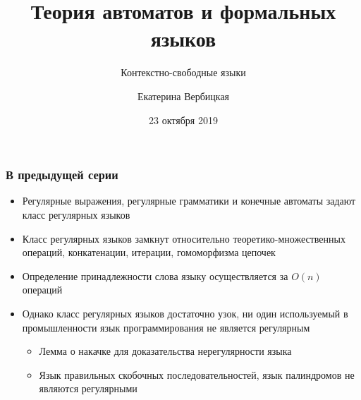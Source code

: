 \documentclass{beamer}
\title[]{Теория автоматов и формальных языков}
\subtitle[]{Контекстно-свободные языки}
\institute[]{
Санкт-Петербургский государственный электротехнический университет <<ЛЭТИ>>\\
}
\author[]{Екатерина Вербицкая}
\date{23 октября 2019}
\begin{document}
{
  \begin{frame}
    \titlepage
  \end{frame}
}


\begin{frame}[fragile]
  \transwipe[direction=90]
  \frametitle{В предыдущей серии}
  \begin{itemize}
    \item Регулярные выражения, регулярные грамматики и конечные автоматы задают класс регулярных языков
    \item Класс регулярных языков замкнут относительно теоретико-множественных операций, конкатенации, итерации, гомоморфизма цепочек
    \item Определение принадлежности слова языку осуществляется за $O(n)$ операций
    \item Однако класс регулярных языков достаточно узок, ни один используемый в промышленности язык программирования не является регулярным
    \begin{itemize}
      \item Лемма о накачке для доказательства нерегулярности языка
      \item Язык правильных скобочных последовательностей, язык палиндромов не являются регулярными
    \end{itemize}
  \end{itemize}
\end{frame}
\end{document}
